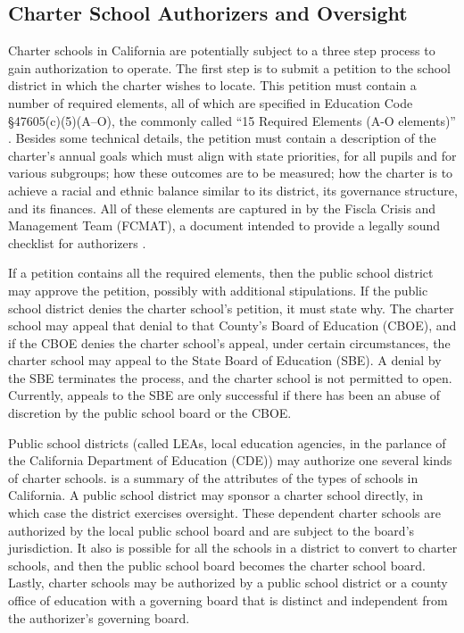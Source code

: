 \subsection{Charter School Authorizers and Oversight}\indent

Charter schools in California are potentially subject to a three step process to gain authorization to operate. The first step is to submit a petition to the school district in which the charter wishes to locate. This petition must contain a number of required elements, all of which are specified in Education Code §47605(c)(5)(A–O), the commonly called ``15 Required Elements (A-O elements)'' \parencite[89]{Aguinaldo.etal2021}. Besides some technical details, the petition must contain a description of the charter's annual goals which must align with state priorities, for all pupils and for various subgroups; how these outcomes are to be measured; how the charter is to achieve a racial and ethnic balance similar to its district, its governance structure, and its finances. All of these elements are captured in \textit{} by the Fiscla Crisis and Management Team (FCMAT), a document intended to provide a legally sound checklist for authorizers \parencite{FCMAT2022}.  %

If a petition contains all the required elements, then the public school district may approve the petition, possibly with additional stipulations. If the public school district denies the charter school's petition, it must state why. The charter school may appeal that denial to that County's Board of Education (CBOE), and if the CBOE denies the charter school's appeal, under certain circumstances, the charter school may appeal to the State Board of Education (SBE). A denial by the SBE terminates the process, and the charter school is not permitted to open. Currently, appeals to the SBE are only successful if there has been an abuse of discretion by the public school board or the CBOE.

Public school districts (called LEAs, local education agencies, in the parlance of the California Department of Education (CDE)) may authorize one several kinds of charter schools.  is a summary of the attributes of the types of schools in California. A public school district may sponsor a charter school directly, in which case the district exercises oversight. These dependent charter schools are authorized by the local public school board and are subject to the board's jurisdiction. It also is possible for all the schools in a district to convert to charter schools, and then the public school board becomes the charter school board. Lastly, charter schools may be authorized by a public school district or a county office of education with a governing board that is distinct and independent from the authorizer's governing board.

